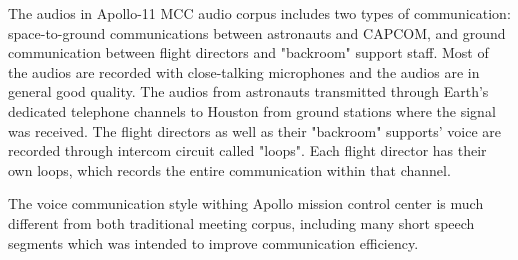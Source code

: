 \documentclass[journal]{IEEEtran}
\begin{document}
The audios in Apollo-11 MCC audio corpus includes two types of communication: space-to-ground communications between astronauts and CAPCOM, and ground communication between flight directors and "backroom" support staff. Most of the audios are recorded with close-talking microphones and the audios are in general good quality. The audios from astronauts transmitted through Earth's dedicated telephone channels to Houston from ground stations where the signal was received. The flight directors as well as their "backroom" supports' voice are recorded through intercom circuit called "loops". Each flight director has their own loops, which records the entire communication within that channel.

The voice communication style withing Apollo mission control center is much different from both traditional meeting corpus, including many short speech segments which was intended to improve communication efficiency. 
\end{document}

